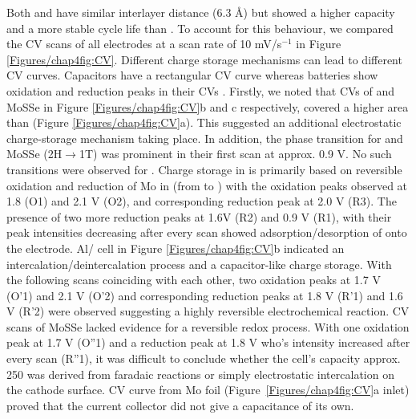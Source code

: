Both  and  have similar interlayer distance (6.3 \AA) but  showed a higher capacity and a more stable cycle life than . To account for this behaviour, we compared the CV scans of all electrodes at a scan rate of 10 mV/s$^{-1}$ in Figure \ref{Figures/chap4fig:CV}. Different charge storage mechanisms can lead to different CV curves. Capacitors have a rectangular CV curve whereas batteries show oxidation and reduction peaks in their CVs \cite{jiao_aluminum-ion_2016}. Firstly, we noted that CVs of  and MoSSe in Figure \ref{Figures/chap4fig:CV}b and c respectively, covered a higher area than  (Figure \ref{Figures/chap4fig:CV}a). This suggested an additional electrostatic charge-storage mechanism taking place. In addition, the phase transition for  and MoSSe (2H$\rightarrow$1T) was prominent in their first scan at approx. 0.9 V. No such transitions were observed for . Charge storage in  is primarily based on reversible oxidation and reduction of Mo in  (from  to ) with the oxidation peaks observed at 1.8 (O1) and 2.1 V (O2), and corresponding reduction peak at 2.0 V (R3). The presence of two more reduction peaks at 1.6V (R2) and 0.9 V (R1), with their peak intensities decreasing after every scan showed adsorption/desorption of  onto the electrode. Al/ cell in Figure \ref{Figures/chap4fig:CV}b indicated an intercalation/deintercalation process and a capacitor-like charge storage. With the following scans coinciding with each other, two oxidation peaks at 1.7 V (O'1) and 2.1 V (O'2) and corresponding reduction peaks at 1.8 V (R'1) and 1.6 V (R'2) were observed suggesting a highly reversible electrochemical reaction. CV scans of MoSSe lacked evidence for a reversible redox process. With one oxidation peak at 1.7 V (O''1) and a reduction peak at 1.8 V who's intensity increased after every scan (R''1), it was difficult to conclude whether the cell's capacity approx. 250 was derived from faradaic reactions or simply electrostatic intercalation on the cathode surface. CV curve from Mo foil (Figure\ \ref{Figures/chap4fig:CV}a inlet) proved that the current collector did not give a capacitance of its own.
